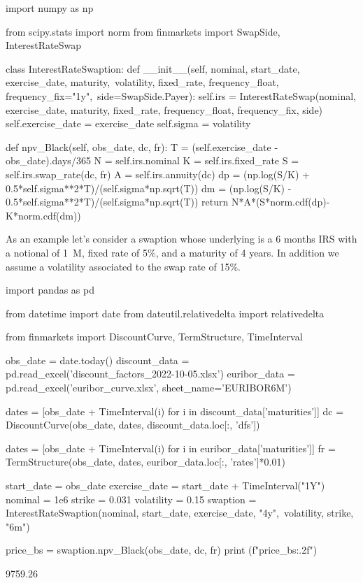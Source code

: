 \begin{ipython}
import numpy as np

from scipy.stats import norm
from finmarkets import SwapSide, InterestRateSwap

class InterestRateSwaption:
    def __init__(self, nominal, start_date, exercise_date, maturity,\
                 volatility, fixed_rate, frequency_float, frequency_fix="1y",\
                 side=SwapSide.Payer):
        self.irs = InterestRateSwap(nominal, exercise_date, maturity, fixed_rate,
                                    frequency_float, frequency_fix, side)
        self.exercise_date = exercise_date
        self.sigma = volatility

    def npv_Black(self, obs_date, dc, fr):
        T = (self.exercise_date - obs_date).days/365
        N = self.irs.nominal
        K = self.irs.fixed_rate
        S = self.irs.swap_rate(dc, fr)
        A = self.irs.annuity(dc)
        dp = (np.log(S/K) + 0.5*self.sigma**2*T)/(self.sigma*np.sqrt(T))
        dm = (np.log(S/K) - 0.5*self.sigma**2*T)/(self.sigma*np.sqrt(T))
        return N*A*(S*norm.cdf(dp)-K*norm.cdf(dm))\end{ipython}

As an example let's consider a swaption whose underlying is a 6 months IRS with a notional of 1~M, fixed rate of 5\%, and a maturity of 4 years. In addition we assume a volatility associated to the swap rate of 15\%.

\begin{ipython}
import pandas as pd

from datetime import date
from dateutil.relativedelta import relativedelta

from finmarkets import DiscountCurve, TermStructure, TimeInterval

obs_date = date.today()
discount_data = pd.read_excel('discount_factors_2022-10-05.xlsx')
euribor_data = pd.read_excel('euribor_curve.xlsx', sheet_name='EURIBOR6M')

dates = [obs_date + TimeInterval(i) for i in discount_data['maturities']]
dc = DiscountCurve(obs_date, dates, discount_data.loc[:, 'dfs'])

dates = [obs_date + TimeInterval(i) for i in euribor_data['maturities']]
fr = TermStructure(obs_date, dates, euribor_data.loc[:, 'rates']*0.01)

start_date = obs_date
exercise_date = start_date + TimeInterval("1Y")
nominal = 1e6
strike = 0.031
volatility = 0.15
swaption = InterestRateSwaption(nominal, start_date, exercise_date, "4y",\
                                volatility, strike, "6m")

price_bs = swaption.npv_Black(obs_date, dc, fr)
print (f"{price_bs:.2f}")
\end{ipython}
\begin{ioutput}
9759.26
\end{ioutput}

